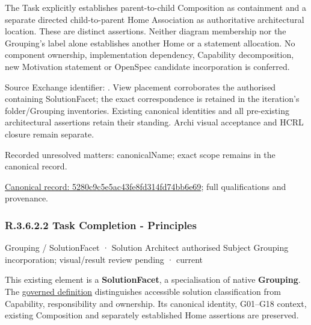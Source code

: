 The Task explicitly establishes parent-to-child Composition as containment and
a separate directed child-to-parent Home Association as authoritative architectural
location. These are distinct assertions. Neither diagram membership nor the
Grouping's label alone establishes another Home or a statement allocation.
No component ownership, implementation dependency, Capability decomposition,
new Motivation statement or OpenSpec candidate incorporation is conferred.



Source Exchange identifier: \texttt{}. View placement corroborates
the authorised containing SolutionFacet; the exact correspondence is retained in the
iteration's folder/Grouping inventories. Existing canonical identities and all
pre-existing architectural assertions retain their standing. Archi visual
acceptance and HCRL closure remain separate.


{\small Recorded unresolved matters: canonicalName; exact scope remains in the canonical record.}\par
{\footnotesize \href{../../../../../../../continuum/grouping/5280c9c5e5ac43fe8fd314fd74bb6e69.md}{Canonical record: 5280c9c5e5ac43fe8fd314fd74bb6e69}; full qualifications and provenance.}\par
\subsubsection*{R.3.6.2.2 Task Completion - Principles}
\label{navigation:R.3.6.2.2}

\label{element:5c36fbab326d484a9f7877b7fb6a2ff9}
{\small Grouping / SolutionFacet · Solution Architect authorised Subject Grouping incorporation; visual/result review pending · current}\par

This existing element is a \textbf{SolutionFacet}, a specialisation of native
\textbf{Grouping}. The \href{\detokenize{../../../../../../../governance/continuum-representation.md#solutionfacet-classification--1119-candidate}}{governed definition}
distinguishes accessible solution classification from Capability, responsibility
and ownership. Its canonical identity, G01–G18 context, existing Composition
and separately established Home assertions are preserved.



